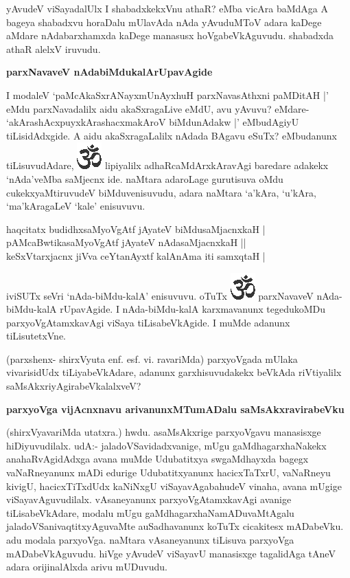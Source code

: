 yAvudeV viSayadalUlx I shabadxkekxVnu athaR? eMba vicAra baMdAga A bageya shabadxvu horaDalu mUlavAda nAda yAvuduMToV adara kaDege aMdare nAdabarxhamxda kaDege manasusx hoVgabeVkAguvudu. shabadxda athaR alelxV iruvudu.

\noindent
{\bf\large{parxNavaveV nAdabiMdukalArUpavAgide}}\label{page161}

I modaleV `paMcAkaSxrANayxmUnAyxhuH parxNavasAthxni paMDitAH |' eMdu parxNavadalilx aidu akaSxragaLive eMdU, avu yAvuvu? eMdare- `akArashAcxpuyxkArashacxmakAroV biMdunAdakw |' eMbudAgiyU tiLisidAdxgide. A aidu akaSxragaLalilx nAdada BAgavu eSuTx? eMbudanunx tiLisuvudAdare, {\includegraphics[scale=.6]{om.eps}} lipiyalilx adhaRcaMdArxkAravAgi baredare adakekx `nAda'veMba saMjecnx ide. naMtara adaroLage gurutisuva oMdu cukekxyaMtiruvudeV biMduvenisuvudu, adara naMtara `a'kAra, `u'kAra, `ma'kAragaLeV `kale' enisuvuvu. 

\begin{shloka}
haqcitatx budidhxsaMyoVgAtf jAyateV biMdusaMjacnxkaH |\\\label{161}
pAMcaBwtikasaMyoVgAtf jAyateV nAdasaMjacnxkaH ||\\
keSxVtarxjacnx jiVva ceYtanAyxtf kalAnAma iti samxqtaH |
\end{shloka}

iviSUTx seVri `nAda-biMdu-kalA' enisuvuvu. oTuTx {\includegraphics[scale=.6]{om.eps}} parxNavaveV nAda-biMdu-kalA rUpavAgide. I nAda-biMdu-kalA karxmavanunx tegedukoMDu parxyoVgAtamxkavAgi viSaya tiLisabeVkAgide. I muMde adanunx tiLisutetxVne.

(parxshenx- shirxVyuta enf. esf. vi. ravariMda) parxyoVgada mUlaka vivarisidUdx tiLiyabeVkAdare, adanunx garxhisuvudakekx beVkAda riVtiyalilx saMsAkxriyAgirabeVkalalxveV?

\noindent
{\bf\large{parxyoVga vijAcnxnavu arivanunxMTumADalu saMsAkxravirabeVku}}

(shirxVyavariMda utatxra.) hwdu. asaMsAkxrige parxyoVgavu manasisxge hiDiyuvudilalx. udA:- jaladoVSavidadxvanige, mUgu gaMdhagarxhaNakekx anahaRvAgidAdxga avana muMde Udubatitxya swgaMdhayxda bagegx vaNaRneyanunx mADi edurige Udubatitxyanunx hacicxTaTxrU, vaNaRneyu kivigU, hacicxTiTxdUdx kaNiNxgU viSayavAgabahudeV vinaha, avana mUgige viSayavAguvudilalx. vAsaneyanunx parxyoVgAtamxkavAgi avanige tiLisabeVkAdare, modalu mUgu gaMdhagarxhaNamADuvaMtAgalu jaladoVSanivaqtitxyAguvaMte auSadhavanunx koTuTx cicakitesx mADabeVku. adu modala parxyoVga. naMtara vAsaneyanunx tiLisuva parxyoVga mADabeVkAguvudu. hiVge yAvudeV viSayavU manasisxge tagalidAga tAneV adara orijinalAlxda arivu mUDuvudu.

